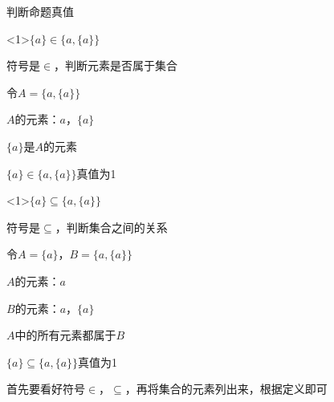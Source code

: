 \documentclass[xetex,10pt,aspectratio=43]{beamer}
\begin{document}
	\begin{frame}{判断命题真值}
		
	\begin{block}{$\{a\}\in\{a,\{a\}\}$}
		
		符号是$\in$，判断元素是否属于集合
		
		令$A=\{a,\{a\}\}$
		
		$A$的元素：$a$，$\{a\}$
		
		$\{a\}$是$A$的元素
		
		$\{a\}\in\{a,\{a\}\}$真值为1
		
	\end{block}

	\begin{block}{$\{a\}\subseteq\{a,\{a\}\}$}
		
		符号是$\subseteq$，判断集合之间的关系
		
		令$A=\{a\}$，$B=\{a,\{a\}\}$
		
		$A$的元素：$a$
		
		$B$的元素：$a$，$\{a\}$
		
		$A$中的所有元素都属于$B$
		
		$\{a\}\subseteq\{a,\{a\}\}$真值为1
	\end{block}
		
	\textcolor{mymauve}{首先要看好符号$\in$，$\subseteq$，再将集合的元素列出来，根据定义即可}
	
	\end{frame}
\end{document}
